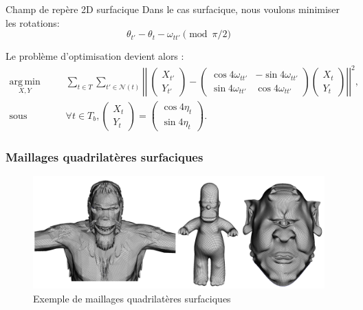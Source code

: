 \documentclass{beamer}
\DeclareMathOperator*{\argmin}{arg\,min}
\begin{document}
\begin{frame}{Champ de repère 2D surfacique}
    \small
    Dans le cas surfacique, nous voulons minimiser les rotations:
    $$
        \theta_{t'} - \theta_{t} - \omega_{tt'} \pmod{\pi/2}
    $$

    Le problème d'optimisation devient alors :
    \small{
    \begin{equation*}
    \begin{array}{ll}
    \underset{X, Y}{\argmin} & \underset{t \in T}{\displaystyle\sum} \underset{t' \in \mathcal{N}(t)}{\displaystyle\sum} \left|\left|\ \begin{pmatrix} X_{t'}\\ Y_{t'}\end{pmatrix} - \begin{pmatrix}\cos4\omega_{tt'} & -\sin4\omega_{tt'} \\ \sin4\omega_{tt'} & \cos4\omega_{tt'} \end{pmatrix} \begin{pmatrix} X_{t}\\ Y_{t}\end{pmatrix} \right|\right|^2, \\
    \text{sous contrainte: } & \forall t \in T_b, \begin{pmatrix} X_{t}\\ Y_{t}\end{pmatrix} = \begin{pmatrix} \cos4\eta_t\\ \sin4\eta_t\end{pmatrix}.
    \end{array}
    \end{equation*}
    }
\end{frame}

\begin{frame}
    \frametitle{Maillages quadrilatères surfaciques}
    \begin{figure}
    \centering
    \includegraphics[width=\textwidth]{img/new_images/CG_models.PNG}
    \caption{Exemple de maillages quadrilatères surfaciques}
    \end{figure}
\end{frame}
\end{document}
